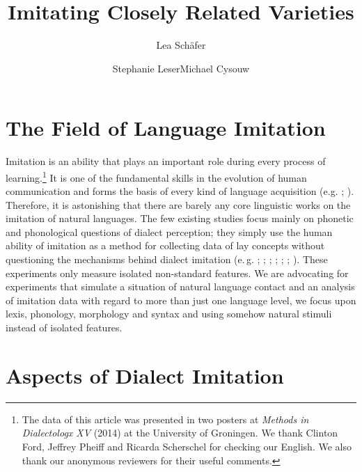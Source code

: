 \documentclass[output=paper]{LSP/langsci}
\author{Lea Schäfer\affiliation{Philipps-Universität Marburg}\and Stephanie Leser\affiliation{Philipps-Universität Marburg}\lastand Michael Cysouw\affiliation{Philipps-Universität Marburg}}
\title{Imitating Closely Related Varieties}
\begin{document}
\newcommand{\qu}[1]{\glqq#1\glqq} %
\newcommand{\quein}[1]{\grq#1\glq} %

   

\section{The Field of Language Imitation}\label{abstract}

Imitation is an ability that plays an important role during every process of learning.\footnote{The data of this article was presented in two posters at \textit{Methods in Dialectologx XV} (2014) at the University of Groningen. We thank Clinton Ford, Jeffrey Pheiff and Ricarda Scherschel for checking our English. We also thank our anonymous reviewers for their useful comments.} It is one of the fundamental skills in the evolution of human communication and forms the basis of every kind of language acquisition  (e.g. \citealt{fitch_evolution_2010,hauser_language_2002,petkov_birds_2012,uzgiris_two_1981,markham_phonetic_1997,markham_listeners_1999,meltzoff_imitation_1977,meltzoff_imitative_2002}; \citealt[123]{tomasello_shared_2007}). Therefore, it is astonishing that there are barely any core linguistic works on the imitation of natural languages. The few existing studies focus mainly on phonetic and phonological questions of dialect perception; they simply use the human ability of imitation as a method for collecting data of lay concepts without questioning the mechanisms behind dialect imitation (e.\,g. \citealt{segerup_imitation_1999}; \cite{siegel_second_2010}; \cite{adank_imitation_2010}; \cite{purschke_imitation_2010}; \cite{babel_phonetic_2009}; \cite{neuhauser_phonetische_2012}; \cite{dossey_spontaneous_2012}). These experiments only measure isolated non-standard features. We are advocating for experiments that simulate a situation of natural language contact and an analysis of imitation data with regard to more than just one language level, we focus upon lexis, phonology, morphology and syntax and using somehow natural stimuli instead of isolated features.
    
\section{Aspects of Dialect Imitation}\label{aspects}
\end{document}
